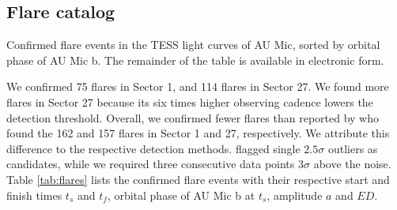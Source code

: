 \documentclass[fleqn,usenatbib,letters]{mnras}%
\begin{document}
\subsection{Flare catalog}
\label{sec:flarecatalog}
\begin{table}
\caption{Confirmed flare events in the TESS light curves of AU Mic, sorted by orbital phase of AU Mic b. The remainder of the table is available in electronic form.}
\centering

\label{tab:flares}
\end{table}

We confirmed 75 flares in Sector 1, and 114 flares in Sector 27. We found more flares in Sector 27 because its six times higher observing cadence lowers the detection threshold. Overall, we confirmed fewer flares than reported by \citet{martioli2021} who found the 162 and 157 flares in Sector 1 and 27, respectively. We attribute this difference to the respective detection methods. \citet{martioli2021} flagged single $2.5\sigma$ outliers as candidates, while we required three consecutive data points $3\sigma$ above the noise. Table \ref{tab:flares} lists the confirmed flare events with their respective start and finish times $t_s$ and $t_f$, orbital phase of AU Mic b at $t_s$, amplitude $a$ and $ED$.
\end{document}

